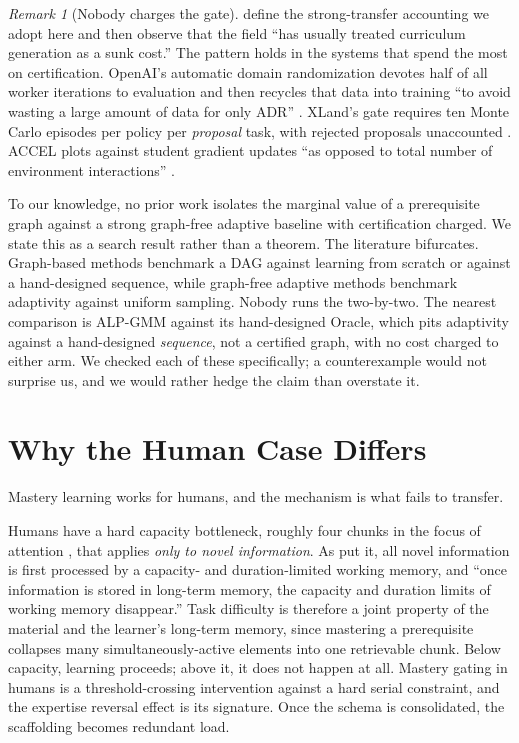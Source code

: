 \documentclass[11pt]{article}
\theoremstyle{plain}
\theoremstyle{definition}
\theoremstyle{remark}
\newtheorem{remark}{Remark}
\begin{document}
\begin{remark}[Nobody charges the gate]
\citet{narvekar2020curriculum} define the strong-transfer accounting we adopt
here and then observe that the field ``has usually treated curriculum generation
as a sunk cost.'' The pattern holds in the systems that spend the most on
certification. OpenAI's automatic domain randomization devotes half of all worker
iterations to evaluation and then recycles that data into training ``to avoid
wasting a large amount of data for only ADR'' \citep{akkaya2019solving}. XLand's
gate requires ten Monte Carlo episodes per policy per \emph{proposal} task, with
rejected proposals unaccounted \citep{openended2021xland}. ACCEL plots against
student gradient updates ``as opposed to total number of environment
interactions'' \citep{parkerholder2022accel}.

To our knowledge, no prior work isolates the marginal value of a prerequisite
graph against a strong graph-free adaptive baseline with certification charged.
We state this as a search result rather than a theorem. The literature
bifurcates. Graph-based methods \citep{svetlik2017automatic,narvekar2020curriculum} benchmark
a DAG against learning from scratch or against a hand-designed sequence, while
graph-free adaptive methods \citep{graves2017automated,matiisen2017tscl,%
portelas2019teacher,jiang2021plr} benchmark adaptivity against uniform sampling.
Nobody runs the two-by-two. The nearest comparison is ALP-GMM against its
hand-designed Oracle, which pits adaptivity against a hand-designed
\emph{sequence}, not a certified graph, with no cost charged to either arm. We
checked each of these specifically; a counterexample would not surprise us, and
we would rather hedge the claim than overstate it.
\end{remark}

\section{Why the Human Case Differs}
\label{sec:human}

Mastery learning works for humans, and the mechanism is what fails to transfer.

Humans have a hard capacity bottleneck, roughly four chunks in the focus of
attention \citep{cowan2001magical}, that applies \emph{only to novel
information}. As \citet{sweller2019cognitive} put it, all novel information is
first processed by a capacity- and duration-limited working memory, and ``once
information is stored in long-term memory, the capacity and duration limits of
working memory disappear.'' Task difficulty is therefore a joint property of the
material and the learner's long-term memory, since mastering a prerequisite
collapses many simultaneously-active elements into one retrievable chunk. Below capacity,
learning proceeds; above it, it does not happen at all. Mastery gating in humans
is a threshold-crossing intervention against a hard serial constraint, and the
expertise reversal effect \citep{kalyuga2003expertise} is its signature. Once the
schema is consolidated, the scaffolding becomes redundant load.
\end{document}
